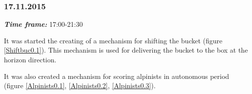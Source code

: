 \subsubsection{17.11.2015}
\textit{\textbf{Time frame:}} 17:00-21:30

It was started the creating of a mechanism for shifting the bucket (figure \ref{Shiftbuc0.1}). This mechanism is used for delivering the bucket to the box at the horizon direction.

It was also created a mechanism for scoring alpinists in autonomous period (figure \ref{Alpinists0.1}, \ref{Alpinists0.2}, \ref{Alpinists0.3}).

\begin{figure}[H]
	\begin{minipage}[h]{0.31\linewidth}

\end{minipage}
\end{figure}
